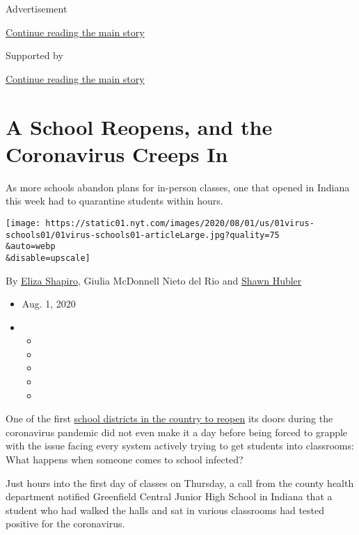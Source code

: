 Advertisement

\protect\hyperlink{after-top}{Continue reading the main story}

Supported by

\protect\hyperlink{after-sponsor}{Continue reading the main story}

\hypertarget{a-school-reopens-and-the-coronavirus-creeps-in}{%
\section{A School Reopens, and the Coronavirus Creeps
In}\label{a-school-reopens-and-the-coronavirus-creeps-in}}

As more schools abandon plans for in-person classes, one that opened in
Indiana this week had to quarantine students within hours.

\texttt{[image: https://static01.nyt.com/images/2020/08/01/us/01virus-schools01/01virus-schools01-articleLarge.jpg?quality=75\\\&auto=webp\\\&disable=upscale]}

By \href{https://www.nytimes.com/by/eliza-shapiro}{Eliza Shapiro},
Giulia McDonnell Nieto del Rio and
\href{https://www.nytimes.com/by/shawn-hubler}{Shawn Hubler}

\begin{itemize}
\item
  Aug. 1, 2020
\item
  \begin{itemize}
  \item
  \item
  \item
  \item
  \item
  \end{itemize}
\end{itemize}

One of the first
\href{https://www.nytimes.com/2020/08/03/us/school-closing-coronavirus.html}{school
districts in the country to reopen} its doors during the coronavirus
pandemic did not even make it a day before being forced to grapple with
the issue facing every system actively trying to get students into
classrooms: What happens when someone comes to school infected?

Just hours into the first day of classes on Thursday, a call from the
county health department notified Greenfield Central Junior High School
in Indiana that a student who had walked the halls and sat in various
classrooms had tested positive for the coronavirus.

